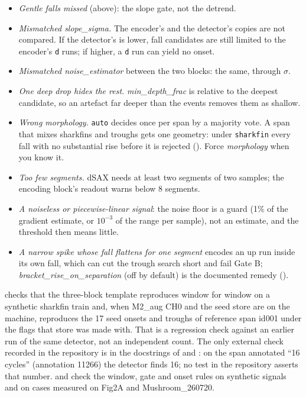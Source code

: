 \begin{itemize}
\item \emph{Gentle falls missed} (above): the slope gate, not the detrend.
\item \emph{Mismatched \emph{slope\_sigma}.} The encoder's and the detector's copies are not
  compared. If the detector's is lower, fall candidates are still limited to the encoder's
  \texttt{d} runs; if higher, a \texttt{d} run can yield no onset.
\item \emph{Mismatched \emph{noise\_estimator}} between the two blocks: the same, through
  $\sigma$.
\item \emph{One deep drop hides the rest.} \emph{min\_depth\_frac} is relative to the deepest
  candidate, so an artefact far deeper than the events removes them as shallow.
\item \emph{Wrong morphology.} \texttt{auto} decides once per span by a majority vote. A span
  that mixes sharkfins and troughs gets one geometry: under \texttt{sharkfin} every fall with
  no substantial rise before it is rejected (). Force
  \emph{morphology} when you know it.
\item \emph{Too few segments.} dSAX needs at least two segments of two samples; the encoding
  block's readout warns below 8 segments.
\item \emph{A noiseless or piecewise-linear signal}: the noise floor is a guard
  (1\% of the gradient estimate, or $10^{-3}$ of the range per sample), not an estimate, and
  the threshold then means little.
\item \emph{A narrow spike whose fall flattens for one segment} encodes an up run inside its
  own fall, which can cut the trough search short and fail Gate B;
  \emph{bracket\_rise\_on\_separation} (off by default) is the documented remedy
  ().
\end{itemize}

 checks that the three-block template reproduces
 window for window on a synthetic sharkfin train and, when M2\_aug CH0 and
the seed store are on the machine, reproduces the 17 seed onsets and troughs of reference span
id001 under the flags that store was made with. That is a regression check against an earlier
run of the same detector, not an independent count. The only external check recorded in the
repository is in the docstrings of  and
: on the span annotated ``16 cycles''
(annotation 11266) the detector finds 16; no test in the repository asserts that number.
 and  check
the window, gate and onset rules on synthetic signals and on cases measured on Fig2A and
Mushroom\_260720.


